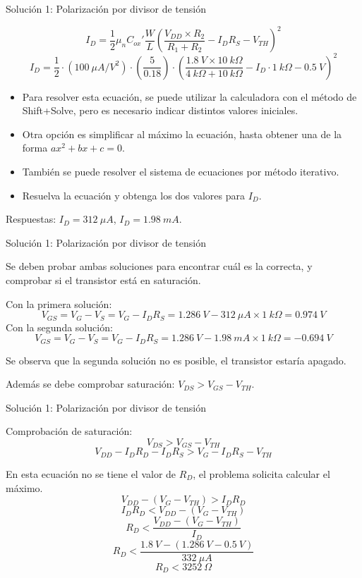 \documentclass[t,aspectratio=169]{beamer}
\begin{document}
\begin{frame}{Solución 1: Polarización por divisor de tensión}

\[ I_D = \dfrac{1}{2} \mu_n C_{ox}' \dfrac{W}{L} \left(\dfrac{V_{DD} \times R_2}{R_1 + R_2} - I_D R_S - V_{TH} \right)^2 \]
%
\[ I_D = \dfrac{1}{2} \cdot (100\ \mu A/V^2) \cdot \left(\dfrac{5}{0.18}\right) \cdot \left(\dfrac{1.8\ V \times 10\ k\Omega}{4\ k\Omega + 10\ k\Omega} - I_D \cdot 1\ k\Omega - 0.5\ V \right)^2 \]


\begin{itemize}
    \item Para resolver esta ecuación, se puede utilizar la calculadora con el método de Shift+Solve, pero es necesario indicar distintos valores iniciales.
    \item Otra opción es simplificar al máximo la ecuación, hasta obtener una de la forma $ax^2+bx+c=0$.
    \item También se puede resolver el sistema de ecuaciones por método iterativo.
    \item Resuelva la ecuación y obtenga los dos valores para $I_D$.
\end{itemize}

\vspace{5mm}
Respuestas: $I_D = 312\ \mu A$, $I_D = 1.98\ mA$.

\end{frame}


\begin{frame}{Solución 1: Polarización por divisor de tensión}

Se deben probar ambas soluciones para encontrar cuál es la correcta, y comprobar si el transistor está en saturación.

\vspace{5mm}
Con la primera solución:
\[ V_{GS} = V_G - V_S = V_G - I_D R_S = 1.286\ V - 312\ \mu A \times 1\ k\Omega = 0.974\ V \]
%
Con la segunda solución:
\[ V_{GS} = V_G - V_S = V_G - I_D R_S = 1.286\ V - 1.98\ mA \times 1\ k\Omega = -0.694\ V \]

Se observa que la segunda solución no es posible, el transistor estaría apagado.

\vspace{5mm}
Además se debe comprobar saturación: $V_{DS} > V_{GS} - V_{TH}$.

\end{frame}


\begin{frame}{Solución 1: Polarización por divisor de tensión}

Comprobación de saturación:
\[ V_{DS} > V_{GS} - V_{TH} \]
\[ V_{DD} - I_D R_D - I_D R_S > V_G - I_D R_S - V_{TH} \]

En esta ecuación no se tiene el valor de $R_D$, el problema solicita calcular el máximo.
\[ V_{DD} - (V_G - V_{TH}) > I_D R_D \]
\[ I_D R_D < V_{DD} - (V_G - V_{TH}) \]
\[ R_D < \dfrac{V_{DD} - (V_G - V_{TH})}{I_D} \]
\[ R_D < \dfrac{1.8\ V - (1.286\ V - 0.5\ V)}{332\ \mu A} \]
\[ R_D < 3252\ \Omega \]

\end{frame}
\end{document}

